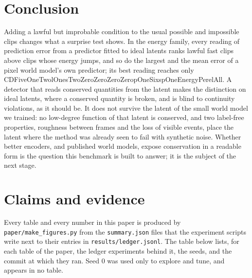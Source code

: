 \documentclass[11pt]{article}
\newcommand{\Cp}[1]{\csname CDFiveOneTwolOnesTwoZeroZeroZeroZeropOneSixspOne#1\endcsname}
\begin{document}
\section{Conclusion}

Adding a lawful but improbable condition to the usual possible and impossible clips changes what a
surprise test shows. In the energy family, every reading of prediction error from a predictor fitted
to ideal latents ranks lawful fast clips above clips whose energy jumps, and so do the largest and the
mean error of a pixel world model's own predictor; its best reading reaches only \Cp{EnergyPerelAll}. A detector that reads conserved quantities from the latent makes the distinction
on ideal latents, where a conserved quantity is broken, and is blind to continuity violations, as it
should be. It does not survive the latent of the small world model we trained: no low-degree function
of that latent is conserved, and two label-free properties, roughness between frames and the loss of
visible events, place the latent where the method was already seen to fail with synthetic noise.
Whether better encoders, and published world models, expose conservation in a readable form is the
question this benchmark is built to answer; it is the subject of the next stage.





\appendix
\section{Claims and evidence}\label{app:ledger}
Every table and every number in this paper is produced by \texttt{paper/make\_figures.py} from the
\texttt{summary.json} files that the experiment scripts write next to their entries in
\texttt{results/ledger.jsonl}. The table below lists, for each table of the paper, the ledger
experiments behind it, the seeds, and the commit at which they ran. Seed 0 was used only to explore
and tune, and appears in no table.

\small

\normalsize
\end{document}
